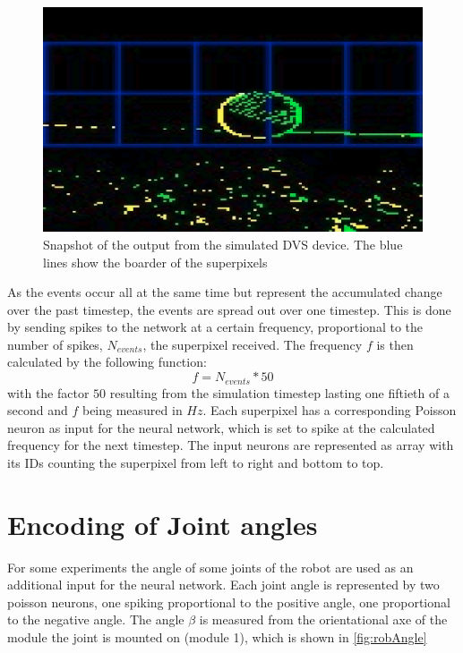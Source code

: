 \begin{figure}[htpb]
  \centering
  \includegraphics[width=\textwidth]{figures/DvsView.png}
  \caption{Snapshot of the output from the simulated DVS device. The blue lines show the boarder of the superpixels}
  \label{fig:dvsView}
\end{figure}

As the events occur all at the same time but represent the accumulated change over the past timestep, the events are spread out over one timestep. This is done by sending spikes to the network at a certain frequency, proportional to the number of spikes, $N_{events}$, the superpixel received. The frequency $f$ is then calculated by the following function:
\begin{equation}
  f = N_{events} * 50
\end{equation}
with the factor $50$ resulting from the simulation timestep lasting one fiftieth of a second and $f$ being measured in $Hz$.  Each superpixel has a corresponding Poisson neuron as input for the neural network, which is set to spike at the calculated frequency for the next timestep.
\newline
The input neurons are represented as array with its IDs counting the superpixel from left to right and bottom to top.

\section{Encoding of Joint angles}\label{sec:EnOfJoint}
For some experiments the angle of some joints of the robot are used as an additional input for the neural network. Each joint angle is represented by two poisson neurons, one spiking proportional to the positive angle, one proportional to the negative angle. The angle $\beta$ is measured from the orientational axe of the module the joint is mounted on (module 1), which is shown in \autoref{fig:robAngle}

